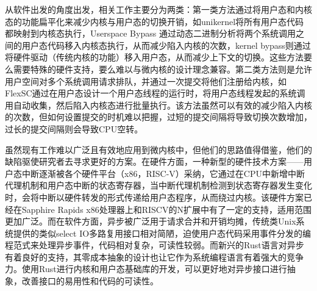 从软件出发的角度出发，相关工作主要分为两类：第一类方法通过将用户态和内核态的功能扁平化来减少内核与用户态的切换开销，如unikernel\cite{kuo2020linux, olivier2019binary, yu2017web}将所有用户态代码都映射到内核态执行，Userspace Bypass\cite{zhou2023userspace} 通过动态二进制分析将两个系统调用之间的用户态代码移入内核态执行，从而减少陷入内核的次数，kernel bypass\cite{jeong2014mtcp, yang2017spdk}则通过将硬件驱动（传统内核的功能）移入用户态，从而减少上下文的切换。这些方法要么需要特殊的硬件支持，要么难以与微内核的设计理念兼容。第二类方法则是允许用户空间对多个系统调用请求排队，并通过一次提交将他们注册给内核，如FlexSC\cite{soares2010flexsc}通过在用户态设计一个用户态线程的运行时，将用户态线程发起的系统调用自动收集，然后陷入内核态进行批量执行。该方法虽然可以有效的减少陷入内核的次数，但如何设置提交的时机难以把握，过短的提交间隔将导致切换次数增加，过长的提交间隔则会导致CPU空转。

虽然现有工作难以广泛且有效地应用到微内核中，但他们的思路值得借鉴，他们的缺陷驱使研究者去寻求更好的方案。在硬件方面，一种新型的硬件技术方案——用户态中断\cite{nassif2022sapphire, RISCVPrivileged2020}逐渐被各个硬件平台（x86，RISC-V）采纳，它通过在CPU中新增中断代理机制和用户态中断的状态寄存器，当中断代理机制检测到状态寄存器发生变化时，会将中断以硬件转发的形式传递给用户态程序，从而绕过内核。该硬件方案已经在Sapphire Rapids x86处理器上和RISCV的N扩展中有了一定的支持，适用范围更加广泛。而在软件方面，异步被广泛用于请求合并和开销均摊，传统类Unix系统提供的类似select IO多路复用接口相对简陋，迫使用户态代码采用事件分发的编程范式来处理异步事件，代码相对复杂，可读性较弱。而新兴的Rust\cite{levy2015ownership, balasubramanian2017system}语言对异步有着良好的支持，其零成本抽象的设计也让它作为系统编程语言有着强大的竞争力。使用Rust进行内核和用户态基础库的开发，可以更好地对异步接口进行抽象，改善接口的易用性和代码的可读性。

